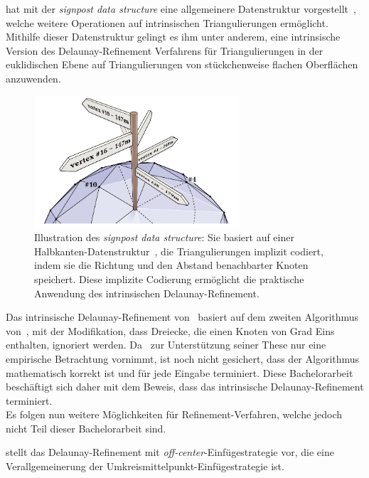 \citet{Sharp:2019:NIT} hat mit der \textit{signpost data structure} eine allgemeinere Datenstruktur vorgestellt~\cite[Abschnitt 3]{Sharp:2019:NIT}, welche weitere Operationen auf intrinsischen Triangulierungen ermöglicht. Mithilfe dieser Datenstruktur gelingt es ihm unter anderem, eine intrinsische Version des Delaunay-Refinement Verfahrens für Triangulierungen in der euklidischen Ebene auf Triangulierungen von stückchenweise flachen Oberflächen~\cite[Definition 1]{Bobenko:2007:LaplaceBeltrami} anzuwenden. 
 \begin{figure}[ht]%
    \centering
  \includegraphics[width=3in]{images/signpostDataStructure.png}
  \caption{Illustration des \textit{signpost data structure}: Sie basiert auf einer Halbkanten-Datenstruktur~\cite{mantyla:1987:halfedge}, die  Triangulierungen implizit codiert, indem sie die Richtung und den Abstand benachbarter Knoten speichert. Diese implizite Codierung ermöglicht die praktische Anwendung des intrinsischen Delaunay-Refinement.  \cite{Bobenko:2006:SIGGRAPH}}
\end{figure}
Das intrinsische Delaunay-Refinement von~\citeauthor{Sharp:2019:NIT} basiert auf dem zweiten Algorithmus von~\citet{chew:1993:guaranteed}, mit der Modifikation, dass Dreiecke, die einen Knoten von Grad Eins enthalten, ignoriert werden. 
Da~\cite{Sharp:2019:NIT} zur Unterstützung seiner These nur eine empirische Betrachtung vornimmt, ist noch nicht gesichert, dass der Algorithmus mathematisch korrekt ist und für jede Eingabe terminiert. Diese Bachelorarbeit beschäftigt sich daher mit dem Beweis, dass das intrinsische Delaunay-Refinement terminiert.\\

Es folgen nun weitere Möglichkeiten für Refinement-Verfahren, welche jedoch nicht Teil dieser Bachelorarbeit sind.

\citet{ungoe:2004:off-center} stellt das Delaunay-Refinement mit \textit{off-center}-Einfügestrategie vor, die eine Verallgemeinerung der Umkreismittelpunkt-Einfügestrategie ist.

